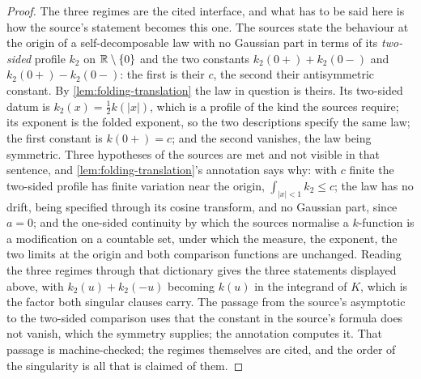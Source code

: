 \begin{proof}
\leanok
The three regimes are the cited interface, and what has to be said here is how the source's
statement becomes this one. The sources state the behaviour at the origin of a self-decomposable
law with no Gaussian part in terms of its \emph{two-sided} profile $k_2$ on $\mathbb{R} \setminus \{0\}$
and the two constants $k_2(0{+}) + k_2(0{-})$ and $k_2(0{+}) - k_2(0{-})$: the first is their
$c$, the second their antisymmetric constant. By \ref{lem:folding-translation} the law in
question is theirs. Its two-sided datum is $k_2(x) = \tfrac12 k(|x|)$, which is a profile of the
kind the sources require; its exponent is the folded exponent, so the two descriptions specify
the same law; the first constant is $k(0{+}) = c$; and the second vanishes, the law being
symmetric. Three hypotheses of the sources are met and not visible in that sentence, and
\ref{lem:folding-translation}'s annotation says why: with $c$ finite the two-sided profile has
finite variation near the origin, $\int_{|x|<1}k_2 \le c$; the law has no drift, being specified
through its cosine transform, and no Gaussian part, since $a = 0$; and the one-sided continuity by
which the sources normalise a $k$-function is a modification on a countable set, under which the
\Levy{} measure, the exponent, the two limits at the origin and both comparison functions are
unchanged. Reading the three regimes through that dictionary gives the three statements
displayed above, with $k_2(u) + k_2(-u)$ becoming $k(u)$ in the integrand of $K$, which is the
factor both singular clauses carry. The passage from the source's asymptotic to the two-sided
comparison uses that the constant in the source's formula does not vanish, which the symmetry
supplies; the annotation computes it. That passage is machine-checked; the regimes themselves are
cited, and the order of the singularity is all that is claimed of them.


\end{proof}
